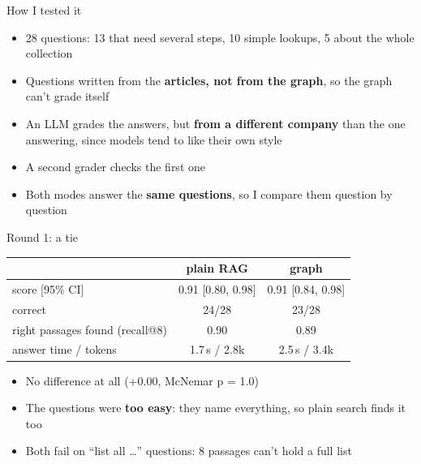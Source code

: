 \documentclass[aspectratio=169,11pt]{beamer}
\newcommand{\hl}[1]{\textcolor{midblue}{\textbf{#1}}}
\begin{document}
\begin{frame}{How I tested it}
  \begin{itemize}
    \item 28 questions: 13 that need several steps, 10 simple lookups, 5 about the whole collection
    \item Questions written from the \hl{articles, not from the graph}, so the graph can't grade itself
    \item An LLM grades the answers, but \hl{from a different company} than the one answering,
          since models tend to like their own style
    \item A second grader checks the first one
    \item Both modes answer the \hl{same questions}, so I compare them question by question
  \end{itemize}
\end{frame}

\begin{frame}{Round 1: a tie}
  \centering
  \begin{tabular}{lcc}
    \toprule
    & plain RAG & graph \\
    \midrule
    score [95\% CI] & 0.91 [0.80, 0.98] & 0.91 [0.84, 0.98] \\
    correct & 24/28 & 23/28 \\
    right passages found (recall@8) & 0.90 & 0.89 \\
    answer time / tokens & 1.7\,s / 2.8k & 2.5\,s / 3.4k \\
    \bottomrule
  \end{tabular}
  \vspace{8pt}
  \begin{itemize}\small
    \item No difference at all (+0.00, McNemar p = 1.0)
    \item The questions were \hl{too easy}: they name everything, so plain search finds it too
    \item Both fail on ``list all \ldots'' questions: 8 passages can't hold a full list
  \end{itemize}
\end{frame}
\end{document}
